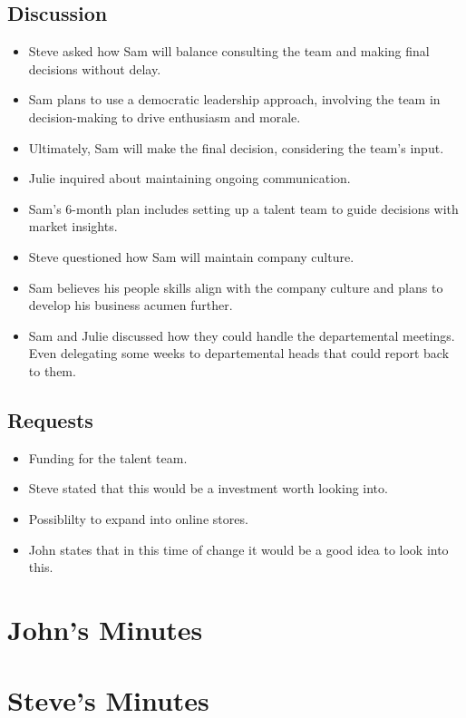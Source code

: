 \documentclass[a4paper,12pt]{article}
\begin{document}
\subsection{Discussion}
\begin{itemize}
    \item Steve asked how Sam will balance consulting the team and making final decisions without delay.
    \item Sam plans to use a democratic leadership approach, involving the team in decision-making to drive enthusiasm and morale.
    \item Ultimately, Sam will make the final decision, considering the team's input.
    \item Julie inquired about maintaining ongoing communication.
    \item Sam's 6-month plan includes setting up a talent team to guide decisions with market insights.
    \item Steve questioned how Sam will maintain company culture.
    \item Sam believes his people skills align with the company culture and plans to develop his business acumen further.
    \item Sam and Julie discussed how they could handle the departemental meetings. Even delegating some weeks to departemental heads that could report back to them.
\end{itemize}

\subsection{Requests}
\begin{itemize}
    \item Funding for the talent team.
    \item Steve stated that this would be a investment worth looking into.
    \item Possiblilty to expand into online stores.
    \item John states that in this time of change it would be a good idea to look into this.
\end{itemize}

\section{John's Minutes}
\author{Graham Pellegrini (Sam)}

\section{Steve's Minutes}
\author{Bahne Thiel-Peters (Julie)}
\end{document}
